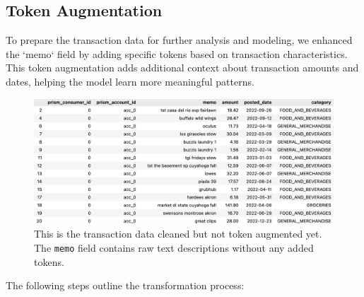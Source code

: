 \documentclass[12pt,letterpaper]{article}
\begin{document}
\subsection{Token Augmentation}
To prepare the transaction data for further analysis and modeling, we enhanced the `memo` field by adding specific tokens based on transaction characteristics. This token augmentation adds additional context about transaction amounts and dates, helping the model learn more meaningful patterns. 

\begin{figure}[h]
    \centering
    \includegraphics[width=\textwidth]{figure/pre_token.jpeg}
    \caption{This is the transaction data cleaned but not token augmented yet. The \texttt{memo} field contains raw text descriptions without any added tokens.}
    \label{fig:cleaned_data}
\end{figure}

The following steps outline the transformation process:
\end{document}
